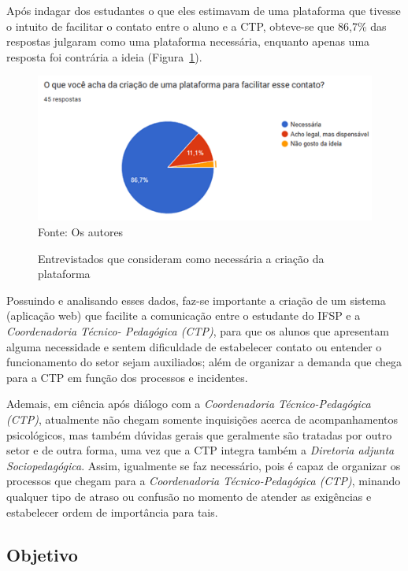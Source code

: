 \documentclass[12pt,a4paper]{article}
\begin{document}
Após indagar dos estudantes o que eles estimavam de uma plataforma que tivesse o intuito de facilitar o contato entre o aluno e a \ac{CTP}, obteve-se que 86,7\% das respostas julgaram como uma plataforma necessária, enquanto apenas uma resposta foi contrária a ideia (Figura~\ref{fig04}).

\begin{figure}[H]
    \centering
    \caption{Entrevistados que consideram como necessária a criação da plataforma}
     \includegraphics[width=15cm]{img4.png}
    Fonte: Os autores
    \label{fig04}
\end{figure}

Possuindo e analisando esses dados, faz-se importante a criação de um sistema (aplicação web) que facilite a comunicação entre o estudante do \ac{IFSP} e a \textit{Coordenadoria Técnico- Pedagógica (CTP)}, para que os alunos que apresentam alguma necessidade e sentem dificuldade de estabelecer contato ou entender o funcionamento do setor sejam auxiliados; além de organizar a demanda que chega para a \ac{CTP} em função dos processos e incidentes.

 Ademais, em ciência após diálogo com a \textit{Coordenadoria Técnico-Pedagógica (CTP)}, atualmente não chegam somente inquisições acerca de acompanhamentos psicológicos, mas também dúvidas gerais que geralmente são tratadas por outro setor e de outra forma, uma vez que a \ac{CTP} integra também a \textit{Diretoria adjunta Sociopedagógica}. Assim, igualmente se faz necessário, pois é capaz de organizar os processos que chegam para a \textit{Coordenadoria Técnico-Pedagógica (CTP)}, minando qualquer tipo de atraso ou confusão no momento de atender as exigências e estabelecer ordem de importância para tais. 

\subsection{Objetivo}
\end{document}
